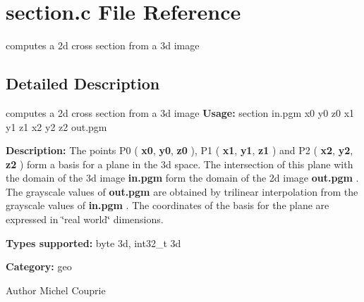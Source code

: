 \section{section.c File Reference}
\label{section_8c}


computes a 2d cross section from a 3d image  




\subsection{Detailed Description}
computes a 2d cross section from a 3d image {\bfseries Usage:} section in.pgm x0 y0 z0 x1 y1 z1 x2 y2 z2 out.pgm

{\bfseries Description:} The points P0 ( {\bfseries x0}, {\bfseries y0}, {\bfseries z0} ), P1 ( {\bfseries x1}, {\bfseries y1}, {\bfseries z1} ) and P2 ( {\bfseries x2}, {\bfseries y2}, {\bfseries z2} ) form a basis for a plane in the 3d space. The intersection of this plane with the domain of the 3d image {\bfseries in.pgm} form the domain of the 2d image {\bfseries out.pgm} . The grayscale values of {\bfseries out.pgm} are obtained by trilinear interpolation from the grayscale values of {\bfseries in.pgm} . The coordinates of the basis for the plane are expressed in \char`\"{}real world\char`\"{} dimensions.

{\bfseries Types supported:} byte 3d, int32\_\-t 3d

{\bfseries Category:} geo

\begin{DoxyAuthor}{Author}
Michel Couprie 
\end{DoxyAuthor}

